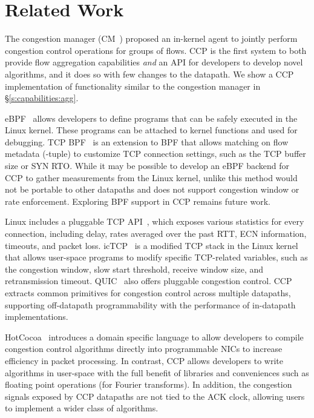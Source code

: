 \section{Related Work}
\label{s:relwork}
The congestion manager (CM~\cite{cm}) proposed an in-kernel agent to jointly perform congestion control operations for groups of flows. CCP is the first system to both provide flow aggregation capabilities \textit{and} an API for developers to develop novel algorithms, and it does so with few changes to the datapath. We show a CCP implementation of functionality similar to the congestion manager in \S\ref{s:capabilities:agg}.

eBPF~\cite{ebpf} allows developers to define programs that can be safely executed in the Linux kernel. These programs can be attached to kernel functions and used for debugging. TCP BPF~\cite{tcpbpf} is an extension to BPF that allows matching on flow metadata (-tuple) to customize TCP connection settings, such as the TCP buffer size or SYN RTO. While it may be possible to develop an eBPF backend for CCP to gather measurements from the Linux kernel, unlike  this method would not be portable to other datapaths and does not support congestion window or rate enforcement. Exploring BPF support in CCP remains future work.

Linux includes a pluggable TCP API~\cite{lwn-pluggable-tcp}, which exposes various statistics for every connection, including delay, rates averaged over the past RTT, ECN information, timeouts, and packet loss. 
icTCP~\cite{icTCP} is a modified TCP stack in the Linux kernel that allows user-space programs to modify specific TCP-related variables, such as the congestion window, slow start threshold, receive window size, and retransmission timeout. QUIC~\cite{quic} also offers pluggable congestion control. CCP extracts common primitives for congestion control across multiple datapaths, supporting off-datapath programmability with the performance of in-datapath implementations.

HotCocoa~\cite{hotcocoa} introduces a domain specific language to allow developers to compile congestion control algorithms directly into  programmable NICs to increase efficiency in packet processing. In contrast, CCP allows developers to write algorithms in user-space with the full benefit of libraries and conveniences such as  floating point operations (\eg for Fourier transforms). 
In addition, the congestion signals exposed by CCP datapaths are not tied to the ACK clock, allowing users to implement a wider class of algorithms. 

